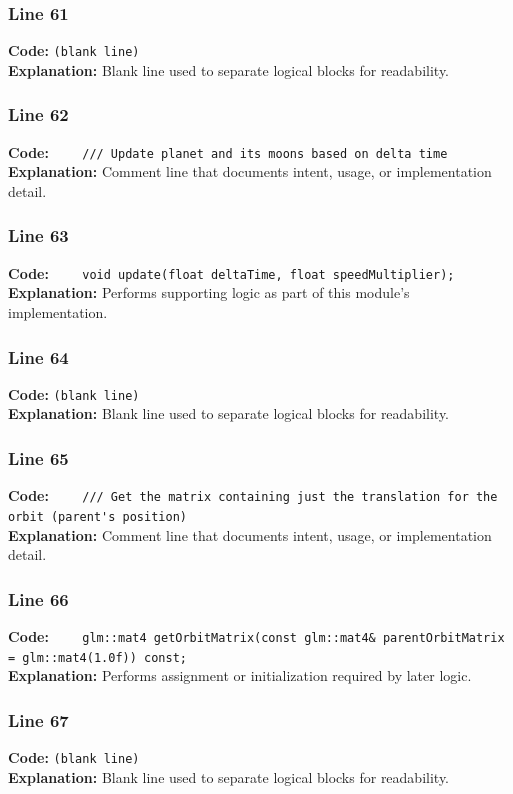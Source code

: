 \documentclass[11pt,a4paper]{article}
\begin{document}
\subsubsection*{Line 61}
\textbf{Code:} \texttt{(blank line)}\\
\textbf{Explanation:} Blank line used to separate logical blocks for readability.

\subsubsection*{Line 62}
\textbf{Code:} \verb|    /// Update planet and its moons based on delta time|\\
\textbf{Explanation:} Comment line that documents intent, usage, or implementation detail.

\subsubsection*{Line 63}
\textbf{Code:} \verb|    void update(float deltaTime, float speedMultiplier);|\\
\textbf{Explanation:} Performs supporting logic as part of this module's implementation.

\subsubsection*{Line 64}
\textbf{Code:} \texttt{(blank line)}\\
\textbf{Explanation:} Blank line used to separate logical blocks for readability.

\subsubsection*{Line 65}
\textbf{Code:} \verb|    /// Get the matrix containing just the translation for the orbit (parent's position)|\\
\textbf{Explanation:} Comment line that documents intent, usage, or implementation detail.

\subsubsection*{Line 66}
\textbf{Code:} \verb|    glm::mat4 getOrbitMatrix(const glm::mat4& parentOrbitMatrix = glm::mat4(1.0f)) const;|\\
\textbf{Explanation:} Performs assignment or initialization required by later logic.

\subsubsection*{Line 67}
\textbf{Code:} \texttt{(blank line)}\\
\textbf{Explanation:} Blank line used to separate logical blocks for readability.
\end{document}
